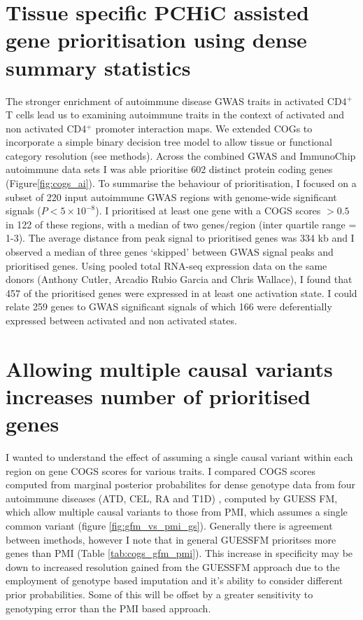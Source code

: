 \documentclass[a4paper,11pt]{report}
\begin{document}
\section{Tissue specific PCHiC assisted gene prioritisation using dense summary statistics}
The stronger enrichment of autoimmune disease GWAS traits in activated CD4$^+$ T cells lead us to examining autoimmune traits in the context of activated and non activated CD4$^{+}$ promoter interaction maps. We extended COGs to  incorporate a simple binary decision tree model to allow tissue or functional category resolution (see methods).  Across the combined GWAS and ImmunoChip autoimmune data sets I was able prioritise 602 distinct protein coding genes  (Figure\ref{fig:cogs_ai}). To summarise the behaviour of prioritisation, I focused on a subset of 220 input autoimmune GWAS regions with genome-wide significant signals ($P<5 \times 10^{-8}$). I prioritised at least one gene with a COGS scores $>0.5$ in 122 of these regions, with a median of two genes/region (inter quartile range = 1-3). The average distance from peak signal to prioritised genes was 334 kb and I observed a median of three genes `skipped' between GWAS signal peaks and prioritised genes. Using pooled total RNA-seq expression data on the same donors (Anthony Cutler, Arcadio Rubio Garcia and Chris Wallace), I found that 457 of the prioritised genes were expressed in at least one activation state. I could relate 259 genes to GWAS significant signals of which 166 were deferentially expressed between activated and non activated states.

\section{Allowing multiple causal variants increases number of prioritised genes}
I wanted to understand the effect of assuming a single causal variant within each region on gene COGS scores for various traits. I compared COGS scores computed from marginal posterior probabilites for dense genotype data from four autoimmune diseases (ATD, CEL, RA and T1D) , computed by GUESS FM, which allow multiple causal variants to those from PMI, which assumes a single common variant (figure \ref{fig:gfm_vs_pmi_gs}). Generally there is agreement between imethods, however I note that in general GUESSFM prioritses more genes than PMI (Table \ref{tab:cogs_gfm_pmi}). This increase in specificity may be down to increased resolution gained from the GUESSFM approach due to the employment of genotype based imputation and it's ability to consider different prior probabilities. Some of this will be offset by a greater sensitivity to genotyping error than the PMI based approach.
\end{document}
